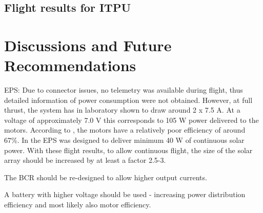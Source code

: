 \subsection{Flight results for ITPU}



\section{Discussions and Future Recommendations}
%
EPS: Due to connector issues, no telemetry was available during flight, thus detailed information of power consumption were not obtained. However, at full thrust, the system has in laboratory shown to draw around 2 x 7.5 A. At a voltage of approximately 7.0 V this corresponds to 105 W power delivered to the motors. According to \cite{website:ModelMotors}, the motors have a relatively poor efficiency of around 67\%. In \cite{CDR} the \ac{EPS} was designed to deliver minimum 40 W of continuous solar power. With these flight results, to allow continuous flight, the size of the solar array should be increased by at least a factor 2.5-3.

The BCR should be re-designed to allow higher output currents. 

A battery with higher voltage should be used - increasing power distribution efficiency and most likely also motor efficiency.
